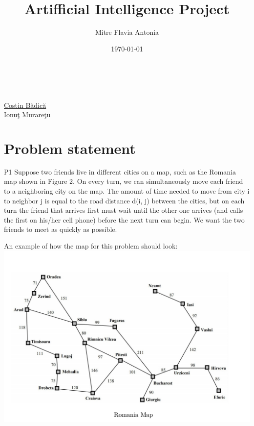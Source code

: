 \documentclass{article}
\begin{document}
\title{Artifficial Intelligence Project}
\author{Mitre Flavia Antonia }
\date{\today}

\maketitle

\begin{tabbing}
\\
\\
 \href{http://software.ucv.ro/~cbadica}{Costin B\u{a}dic\u{a}} \\
  Ionu\c{t} Murare\c{t}u \\


\end{tabbing}
\pagebreak


\section{Problem statement}
P1 Suppose two friends live in different cities on a map, such as the Romania
map shown in Figure 2. On every turn, we can simultaneously move each
friend to a neighboring city on the map. The amount of time needed to
move from city i to neighbor j is equal to the road distance d(i, j) between
the cities, but on each turn the friend that arrives first must wait until the
other one arrives (and calls the first on his/her cell phone) before the next
turn can begin. We want the two friends to meet as quickly as possible.


An example of how the map for this problem should look:
\linebreak
\includegraphics[scale=0.5]{romania.png}
 
\end{document}
